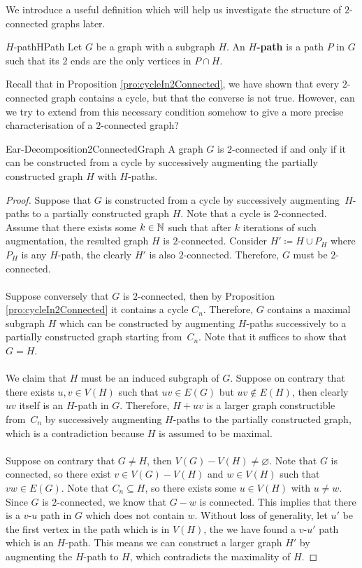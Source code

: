 \documentclass[math]{amznotes}
\theoremstyle{remark}
\begin{document}
We introduce a useful definition which will help us investigate the structure of $2$-connected graphs later.
\begin{dfnbox}{$H$-path}{HPath}
    Let $G$ be a graph with a subgraph $H$. An {\color{red} \textbf{$H$-path}} is a path $P$ in $G$ such that its $2$ ends are the only vertices in $P \cap H$.
\end{dfnbox}
Recall that in Proposition \ref{pro:cycleIn2Connected}, we have shown that every $2$-connected graph contains a cycle, but that the converse is not true. However, can we try to extend from this necessary condition somehow to give a more precise characterisation of a $2$-connected graph?
\begin{thmbox}{Ear-Decomposition}{2ConnectedGraph}
    A graph $G$ is $2$-connected if and only if it can be constructed from a cycle by successively augmenting the partially constructed graph $H$ with $H$-paths.
    \tcblower
    \begin{proof}
        Suppose that $G$ is constructed from a cycle by successively augmenting~$H$-paths to a partially constructed graph $H$. Note that a cycle is $2$-connected. Assume that there exists some $k \in \mathbb{N}$ such that after $k$ iterations of such augmentation, the resulted graph $H$ is $2$-connected. Consider $H' \coloneqq H \cup P_H$ where $P_H$ is any $H$-path, the clearly $H'$ is also $2$-connected. Therefore, $G$ must be $2$-connected.
        \\\\
        Suppose conversely that $G$ is $2$-connected, then by Proposition \ref{pro:cycleIn2Connected} it contains a cycle $C_n$. Therefore, $G$ contains a maximal subgraph $H$ which can be constructed by augmenting $H$-paths successively to a partially constructed graph starting from~$C_n$. Note that it suffices to show that $G = H$.
        \\\\
        We claim that $H$ must be an induced subgraph of $G$. Suppose on contrary that there exists $u, v \in V(H)$ such that $uv \in E(G)$ but $uv \notin E(H)$, then clearly $uv$ itself is an $H$-path in $G$. Therefore, $H + uv$ is a larger graph constructible from~$C_n$ by successively augmenting $H$-paths to the partially constructed graph, which is a contradiction because $H$ is assumed to be maximal.
        \\\\
        Suppose on contrary that $G \neq H$, then $V(G) - V(H) \neq \varnothing$. Note that $G$ is connected, so there exist $v \in V(G) - V(H)$ and $w \in V(H)$ such that $vw \in E(G)$. Note that $C_n \subseteq H$, so there exists some $u \in V(H)$ with $u \neq w$. Since $G$ is $2$-connected, we know that $G - w$ is connected. This implies that there is a $v$-$u$ path in $G$ which does not contain $w$. Without loss of generality, let $u'$ be the first vertex in the path which is in $V(H)$, the we have found a $v$-$u'$ path which is an $H$-path. This means we can construct a larger graph $H'$ by augmenting the $H$-path to $H$, which contradicts the maximality of $H$.
    \end{proof}
\end{thmbox}
\end{document}
